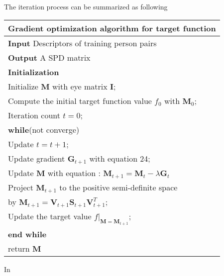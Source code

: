  The iteration process can be summarized as following \newline \newline 
 \begin{table}
 \centering
 \begin{tabular}{l}
 \hline 
 \multicolumn{1}{l}{\textbf{Gradient optimization algorithm for target function}} \\
 \hline
 \textbf{Input} Descriptors of training person pairs \\
 \textbf{Output} A SPD matrix\\
 \textbf{Initialization} \\
 Initialize $\bm{M}$ with eye matrix $\bm{I}$; \\
 Compute the initial target function value $f_0$ with $\bm{M}_0$;\\
 Iteration count  $t = 0$;\\

 \textbf{while}(not converge)\\
 \indent Update $t =  t + 1$;\\
 \indent Update gradient $\bm{G}_{t+1}$ with equation 24;\\
 \indent Update $\bm{M}$ with equation : $\bm{M}_{t+1} = \bm{M}_{t} - \lambda\bm{G}_t$\\
 \indent Project $\bm{M}_{t+1}$ to the positive semi-definite space \\ 
 \indent \indent by $\bm{M}_{t+1}= \bm{V}_{t+1}\bm{S}_{t+1}\bm{V}^T_{t+1}$;\\
 \indent Update the target value $f|_{\bm{M} = \bm{M}_{t+1}}$;\\
 \textbf{end while}  \\
 return $\bm{M}$\\
 \hline

 \end{tabular} 
 \end{table}
 \newline 
 
 In 
 
 
 
 
 
